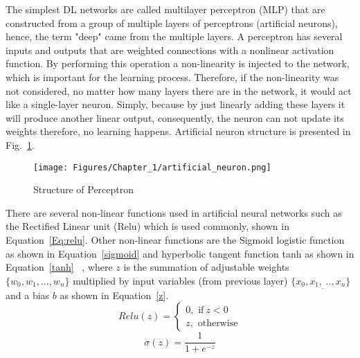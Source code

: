 The simplest DL networks are called multilayer perceptron (MLP) that are constructed from a group of multiple layers of perceptrons (artificial neurons), hence, the term "deep" came from the multiple layers.
A perceptron has several inputs and outputs that are weighted connections with a nonlinear activation function.
By performing this operation a non-linearity is injected to the network, which is important for the learning process.
Therefore, if the non-linearity was not considered, no matter how many layers there are  in the network, it would act like a single-layer neuron. 
Simply, because by just linearly adding these layers it will produce another linear output, consequently, the neuron can not update its weights therefore, no learning happens. Artificial neuron structure is presented in Fig.~\ref{fig:artificial Neuron}.
\begin{figure} [!ht]
	\begin{center}
		\centering
		\texttt{[image: Figures/Chapter\_1/artificial\_neuron.png]}
	\end{center}
	\caption{Structure of Perceptron} 
	\label{fig:artificial Neuron}
\end{figure}
There are several non-linear functions used in artificial neural networks such as the Rectified Linear unit (Relu) which is used commonly, shown in Equation~\ref{Eq:relu}. Other non-linear functions are the Sigmoid logistic function as shown in Equation~\ref{sigmoid} and hyperbolic tangent function tanh as shown in Equation~\ref{tanh} ~\cite{Lecun2015}, where \(z\) is the summation of adjustable weights \(\{w_0,w_1,...,w_n \}\) multiplied by input variables (from previous layer) \(\{x_0,x_1,_...,x_n\}\) and a bias \(b\) as shown in Equation~\ref{z}.
\begin{equation}
	Relu(z) = 
	\begin{cases}
		0,  \text{  if}\ z<0\\
		z,  \text{  otherwise}
	\end{cases}
	\label{Eq:relu}
\end{equation}
\begin{equation}
	\sigma(z) = \frac{1}{1+e^{-z}}
	\label{sigmoid}
\end{equation}
